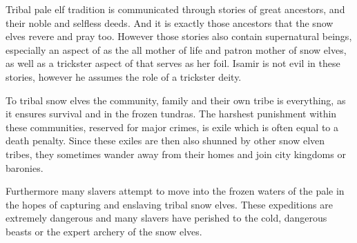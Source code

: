 Tribal pale elf tradition is communicated through stories of great ancestors,
and their noble and selfless deeds. And it is exactly those ancestors that the
snow elves revere and pray too. However those stories also contain
supernatural beings, especially an aspect of  as the all
mother of life and patron mother of snow elves, as well as a trickster aspect
of  that serves as her foil. Isamir is not evil in these
stories, however he assumes the role of a trickster deity.

To tribal snow elves the community, family and their own tribe is everything, as
it ensures survival and in the frozen tundras. The harshest punishment within
these communities, reserved for major crimes, is exile which is often equal to
a death penalty. Since these exiles are then also shunned by other snow elven
tribes, they sometimes wander away from their homes and join city kingdoms or
baronies.

Furthermore many slavers attempt to move into the frozen waters of the pale
in the hopes of capturing and enslaving tribal snow elves. These expeditions
are extremely dangerous and many slavers have perished to the cold, dangerous
beasts or the expert archery of the snow elves.
